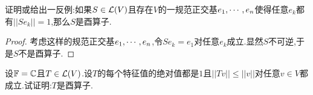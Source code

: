 \documentclass{ctexart}
\begin{document}
\begin{problem}[8.]
    证明或给出一反例:如果$S\in\mathcal{L}(V)$且存在$V$的一规范正交基${e}_1,\cdots,{e}_{n}$使得任意$e_k$都有$||Se_k||=1$,那么$S$是酉算子.
\end{problem}
\begin{proof}
    考虑这样的规范正交基${e}_1,\cdots,{e}_{n}$,令$Se_k=e_1$对任意$e_k$成立.显然$S$不可逆,于是$S$不是酉算子.
\end{proof}
\begin{problem}[9.]
    设$\mathbb{F}=\mathbb{C}$且$T\in\mathcal{L}(V)$.设$T$的每个特征值的绝对值都是$1$且$||Tv||\leqslant||v||$对任意$v\in V$都成立.试证明:$T$是酉算子.
\end{problem}
\end{document}
